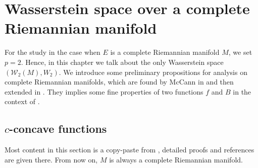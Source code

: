 \chapter{Wasserstein space over a complete Riemannian manifold}

For the study in the case when $E$ is a complete Riemannian manifold $M$,
we set $p = 2$.
Hence, in this chapter we talk about the only Wasserstein space $(\mathcal{W}_2(M), W_2)$.
We introduce some preliminary propositions for analysis on complete Riemannian manifolds,
which are found by McCann in \cite{mccann2001polar} and then extended in \cite{cordero2001riemannian}.
They implies some fine properties of two functions $f$ and $B$ in the context of .
\section{\texorpdfstring{$c$}{c}-concave functions}

Most content in this section is a copy-paste from \cite{cordero2001riemannian},
detailed proofs and references are given there.
From now on, $M$ is always a complete Riemannian manifold.

